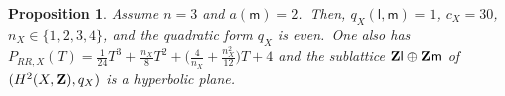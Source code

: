 \documentclass[12pt]{amsart}
\def\Z{{\bf Z}}
\newtheorem{prop}[lemm]{Proposition}
\theoremstyle{remark}
\def\lll{\ensuremath{\mathsf l}}
\def\mm{\ensuremath{\mathsf m}}
\begin{document}
\begin{prop}\label{prop45}
Assume $n=3$ and $a(\mm)=2$.\ Then,
 $q_X(\lll,\mm)=1$, $c_X=30$, $n_X \in\{1,2,3,4 \}$, and the quadratic form $q_X$ is even.\ One also has $P_{RR,X}(T)=
   \frac{1}{24}T^3+\frac{n_X}{8}T^2+
 \bigl(\frac{4}{n_X}+\frac{n_X^2}{12}\bigr)T
  +4$
and the sublattice $\Z\lll\oplus \Z\mm$ of $(H^2(X,\Z),q_X)$ is a hyperbolic plane.
\end{prop}
\end{document}
